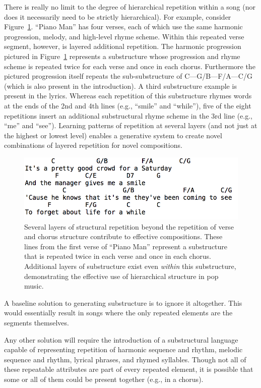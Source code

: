 \documentclass[11pt,phd]{byuprop}
\begin{document}
There is really no limit to the degree of hierarchical repetition within a song (nor does it necessarily need to be strictly hierarchical). For example, consider Figure~\ref{fig:substructure_example}. ``Piano Man'' has four verses, each of which use the same harmonic progression, melody, and high-level rhyme scheme. Within this repeated verse segment, however, is layered additional repetition. The harmonic progression pictured in Figure~\ref{fig:substructure_example} represents a substructure whose progression and rhyme scheme is repeated twice for each verse and once in each chorus. Furthermore the pictured progression itself repeats the sub-substructure of C---G/B---F/A---C/G (which is also present in the introduction). A third substructure example is present in the lyrics. Whereas each repetition of this substructure rhymes words at the ends of the 2nd and 4th lines (e.g., ``smile'' and ``while''), five of the eight repetitions insert an additional substructural rhyme scheme in the 3rd line (e.g., ``me'' and ``see''). Learning patterns of repetition at several layers (and not just at the highest or lowest level) enables a generative system to create novel combinations of layered repetition for novel compositions.

\begin{figure}
  \centering
  \includegraphics[width=.5\textwidth]{graphics/subtructure_example.png}
  \caption{Several layers of structural repetition beyond the repetition of verse and chorus structure contribute to effective compositions. These lines from the first verse of ``Piano Man'' represent a substructure that is repeated twice in each verse and once in each chorus. Additional layers of substructure exist even \emph{within} this substructure, demonstrating the effective use of hierarchical structure in pop music.}
    \label{fig:substructure_example}
\end{figure}

A baseline solution to generating substructure is to ignore it altogether. This would essentially result in songs where the only repeated elements are the segments themselves.

Any other solution will require the introduction of a substructural language capable of representing repetition of harmonic sequence and rhythm, melodic sequence and rhythm, lyrical phrases, and rhymed syllables. Though not all of these repeatable attributes are part of every repeated element, it is possible that some or all of them could be present together (e.g., in a chorus). %
\end{document}
